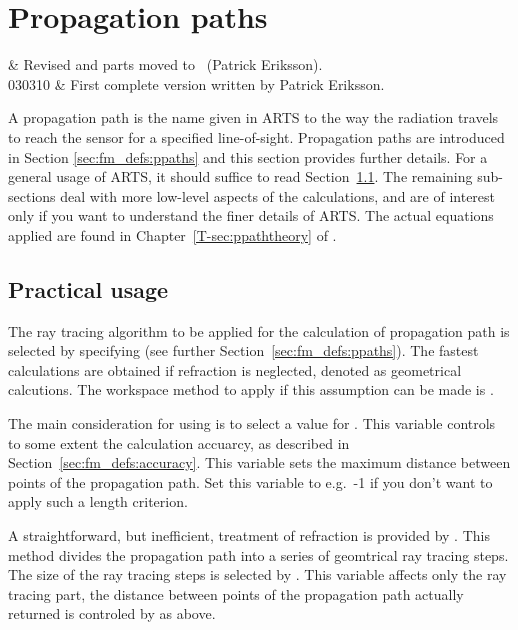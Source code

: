 \chapter{Propagation paths}
 \label{sec:ppath}


 & Revised and parts moved to \theory\ (Patrick Eriksson).\\
  030310 & First complete version written by Patrick Eriksson.\\
\stophistory


\graphicspath{{Figs/ppath/}}


A propagation path is the name given in ARTS to the way the radiation travels
to reach the sensor for a specified line-of-sight. Propagation paths are
introduced in Section \ref{sec:fm_defs:ppaths} and this section provides
further details. For a general usage of ARTS, it should suffice to read
Section~\ref{sec:ppath:usage}. The remaining sub-sections deal with more
low-level aspects of the calculations, and are of interest only if you want to
understand the finer details of ARTS. The actual equations applied are found in
Chapter~\ref{T-sec:ppaththeory} of \theory.


\section{Practical usage}
\label{sec:ppath:usage}


The ray tracing algorithm to be applied for the calculation of propagation path
is selected by specifying  (see
further Section~\ref{sec:fm_defs:ppaths}). The fastest calculations are
obtained if refraction is neglected, denoted as geometrical calcutions. The
workspace method to apply if this assumption can be made is
. 

The main consideration for using  is to select
a value for . This variable controls to some extent the
calculation accuarcy, as described in Section~\ref{sec:fm_defs:accuracy}. This
variable sets the maximum distance between points of the propagation
path. Set this variable to e.g.\ -1 if you don't want to apply such a length
criterion.

A straightforward, but inefficient, treatment of refraction is provided by
. This method divides the propagation path
into a series of geomtrical ray tracing steps. The size of the ray tracing
steps is selected by . This variable affects only
the ray tracing part, the distance between points of the propagation path
actually returned is controled by  as above.





